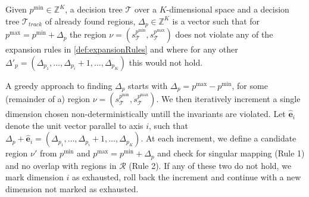 

\begin{definition}\label{def:deltaP}
    Given $p^{\min} \in \mathbb{Z}^{K}$, a decision tree $\mathcal{T}$ over a
    $K$-dimensional space and a decision tree $\mathcal{T}_{track}$ of already
    found regions, $\Delta_{p} \in \mathbb{Z}^{K}$ is a vector such that for
    $p^{\max} = p^{\min} + \Delta_{p}$ the region $\nu =
    (s^{p^{\min}}_{\mathcal{T}}, s^{p^{\max}}_{\mathcal{T}})$ does not violate
    any of the expansion rules in \cref{def:expansionRules} and where
    for any other $\Delta'_p = (\Delta_{p_{1}}, \ldots, \Delta_{p_{i}} + 1,
    \ldots, \Delta_{p_{K}})$ this would not hold.
\end{definition}

\noindent A greedy approach to finding $\Delta_{p}$ starts with $\Delta_{p} =
p^{\max} - p^{\min}$, for some (remainder of a) region $\nu =
(s^{p^{\min}}_{\mathcal{T}}, s^{p^{\max}}_{\mathcal{T}})$. We then iteratively
increment a single dimension chosen non-deterministically untill the invariants
are violated.  Let $\mathbf{\hat{e}}_i$ denote the unit vector parallel to axis
$i$, such that $\Delta_{p} + \mathbf{\hat{e}}_i =
(\Delta_{p_1},\ldots,\Delta_{p_i} + 1,\ldots,\Delta_{p_K})$. At each increment,
we define a candidate region $\nu'$ from $p^{\min}$ and $p^{\max} = p^{\min} +
\Delta_{p}$ and check for singular mapping (Rule 1) and no overlap with regions
in $\mathcal{R}$ (Rule 2). If any of these two do not hold, we mark dimension
$i$ as exhausted, roll back the increment and continue with a new dimension not
marked as exhausted.

